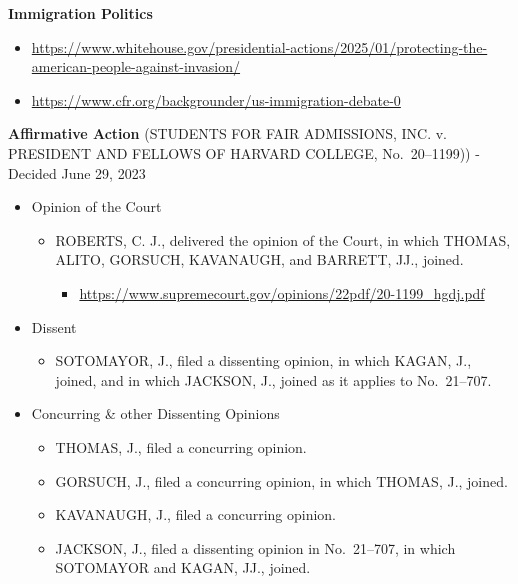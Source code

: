 \documentclass[]{tufte-handout}
\providecommand{\tightlist}{%
  \setlength{\itemsep}{0pt}\setlength{\parskip}{0pt}}
\begin{document}
\textbf{Immigration Politics}

\begin{itemize}
\tightlist
\item
  \url{https://www.whitehouse.gov/presidential-actions/2025/01/protecting-the-american-people-against-invasion/}
\item
  \url{https://www.cfr.org/backgrounder/us-immigration-debate-0}
\end{itemize}

\textbf{Affirmative Action} (STUDENTS FOR FAIR ADMISSIONS, INC. v.
PRESIDENT AND FELLOWS OF HARVARD COLLEGE, No.~20--1199)) - Decided June
29, 2023

\begin{itemize}
\tightlist
\item
  Opinion of the Court

  \begin{itemize}
  \tightlist
  \item
    ROBERTS, C. J., delivered the opinion of the Court, in which THOMAS,
    ALITO, GORSUCH, KAVANAUGH, and BARRETT, JJ., joined.

    \begin{itemize}
    \tightlist
    \item
      \url{https://www.supremecourt.gov/opinions/22pdf/20-1199_hgdj.pdf}
    \end{itemize}
  \end{itemize}
\item
  Dissent

  \begin{itemize}
  \tightlist
  \item
    SOTOMAYOR, J., filed a dissenting opinion, in which KAGAN, J.,
    joined, and in which JACKSON, J., joined as it applies to
    No.~21--707.
  \end{itemize}
\item
  Concurring \& other Dissenting Opinions

  \begin{itemize}
  \tightlist
  \item
    THOMAS, J., filed a concurring opinion.
  \item
    GORSUCH, J., filed a concurring opinion, in which THOMAS, J.,
    joined.
  \item
    KAVANAUGH, J., filed a concurring opinion.
  \item
    JACKSON, J., filed a dissenting opinion in No.~21--707, in which
    SOTOMAYOR and KAGAN, JJ., joined.
  \end{itemize}
\end{itemize}
\end{document}
